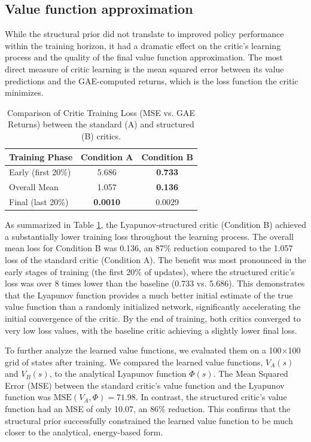 \documentclass[]{article}
\begin{document}
\subsection{Value function approximation}
While the structural prior did not translate to improved policy performance within the training horizon, it had a dramatic effect on the critic's learning process and the quality of the final value function approximation. The most direct measure of critic learning is the mean squared error between its value predictions and the GAE-computed returns, which is the loss function the critic minimizes.

\begin{table}[h!]
\centering
\caption{Comparison of Critic Training Loss (MSE vs. GAE Returns) between the standard (A) and structured (B) critics.}
\label{tab:critic_loss}
\begin{tabular}{lcc}
\hline
\hline
Training Phase & Condition A & Condition B \\
\hline
Early (first 20\%) & 5.686 & \textbf{0.733} \\
Overall Mean & 1.057 & \textbf{0.136} \\
Final (last 20\%) & \textbf{0.0010} & 0.0029 \\
\hline
\end{tabular}
\end{table}

As summarized in Table \ref{tab:critic_loss}, the Lyapunov-structured critic (Condition B) achieved a substantially lower training loss throughout the learning process. The overall mean loss for Condition B was 0.136, an 87\% reduction compared to the 1.057 loss of the standard critic (Condition A). The benefit was most pronounced in the early stages of training (the first 20\% of updates), where the structured critic's loss was over 8 times lower than the baseline (0.733 vs. 5.686). This demonstrates that the Lyapunov function provides a much better initial estimate of the true value function than a randomly initialized network, significantly accelerating the initial convergence of the critic. By the end of training, both critics converged to very low loss values, with the baseline critic achieving a slightly lower final loss.

To further analyze the learned value functions, we evaluated them on a 100$\times$100 grid of states after training. We compared the learned value functions, $V_A(s)$ and $V_B(s)$, to the analytical Lyapunov function $\Phi(s)$. The Mean Squared Error (MSE) between the standard critic's value function and the Lyapunov function was $\text{MSE}(V_A, \Phi) = 71.98$. In contrast, the structured critic's value function had an MSE of only 10.07, an 86\% reduction. This confirms that the structural prior successfully constrained the learned value function to be much closer to the analytical, energy-based form.
\end{document}
